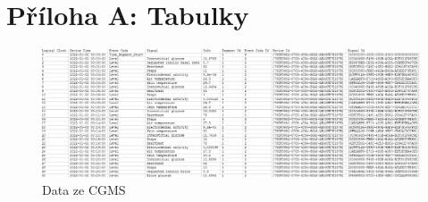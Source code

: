 \chapter*{Příloha A: Tabulky}


\begin{figure}[H]
\caption{Data ze CGMS}
\label{tab:cgms_data}
\centering
\begin{sideways}
\includegraphics[height=0.28\textheight]{img/cho/cgms_data.png}
\end{sideways}
\end{figure}
